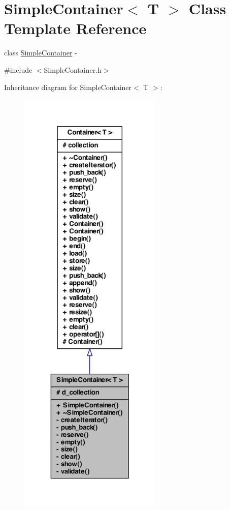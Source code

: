 \hypertarget{class_simple_container}{
\section{SimpleContainer$<$ T $>$ Class Template Reference}
\label{class_simple_container}
}


class \hyperlink{class_simple_container}{SimpleContainer} -\/  




{\ttfamily \#include $<$SimpleContainer.h$>$}



Inheritance diagram for SimpleContainer$<$ T $>$:\nopagebreak
\begin{figure}[H]
\begin{center}
\leavevmode
\includegraphics[height=600pt]{class_simple_container__inherit__graph}
\end{center}
\end{figure}


